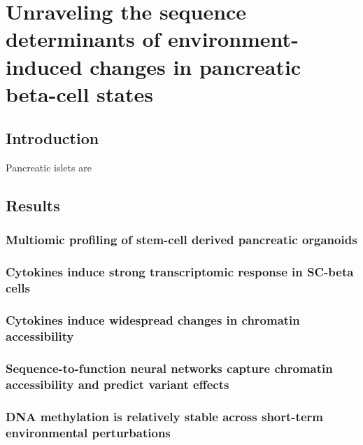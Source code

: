 \chapter{Unraveling the sequence determinants of environment-induced changes in pancreatic beta-cell states}
\label{chap:chapter 3}

\section{Introduction}

Pancreatic islets are

\section{Results}

\subsection{Multiomic profiling of stem-cell derived pancreatic organoids}

\subsection{Cytokines induce strong transcriptomic response in SC-beta cells}

\subsection{Cytokines induce widespread changes in chromatin accessibility}

\subsection{Sequence-to-function neural networks capture chromatin accessibility and predict variant effects}

\subsection{DNA methylation is relatively stable across short-term environmental perturbations}
